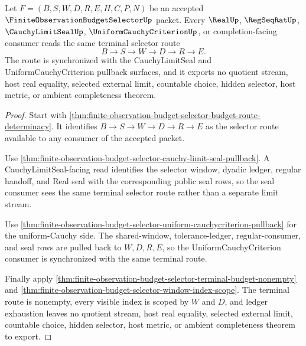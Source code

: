 \begin{theorem}
\label{thm:finite-observation-budget-selector-terminal-selector-synchronization}
Let $F=(B,S,W,D,R,E,H,C,P,N)$ be an accepted $\FiniteObservationBudgetSelectorUp$ packet. Every $\RealUp$, $\RegSeqRatUp$, $\CauchyLimitSealUp$, $\UniformCauchyCriterionUp$, or completion-facing consumer reads the same terminal selector route
$$
B \to S \to W \to D \to R \to E.
$$
The route is synchronized with the CauchyLimitSeal and UniformCauchyCriterion pullback surfaces, and it exports no quotient stream, host real equality, selected external limit, countable choice, hidden selector, host metric, or ambient completeness theorem.
\end{theorem}
\begin{proof}
Start with \autoref{thm:finite-observation-budget-selector-budget-route-determinacy}. It identifies $B \to S \to W \to D \to R \to E$ as the selector route available to any consumer of the accepted packet.

Use \autoref{thm:finite-observation-budget-selector-cauchy-limit-seal-pullback}. A CauchyLimitSeal-facing read identifies the selector window, dyadic ledger, regular handoff, and Real seal with the corresponding public seal rows, so the seal consumer sees the same terminal selector route rather than a separate limit stream.

Use \autoref{thm:finite-observation-budget-selector-uniform-cauchycriterion-pullback} for the uniform-Cauchy side. The shared-window, tolerance-ledger, regular-consumer, and seal rows are pulled back to $W,D,R,E$, so the UniformCauchyCriterion consumer is synchronized with the same terminal route.

Finally apply \autoref{thm:finite-observation-budget-selector-terminal-budget-nonempty} and \autoref{thm:finite-observation-budget-selector-window-index-scope}. The terminal route is nonempty, every visible index is scoped by $W$ and $D$, and ledger exhaustion leaves no quotient stream, host real equality, selected external limit, countable choice, hidden selector, host metric, or ambient completeness theorem to export.
\end{proof}

